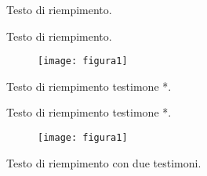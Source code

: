 \documentclass[a4paper]{article}
\begin{document}
\beginnumbering \pstart\Unit Testo di riempimento. \pend
\pausenumbering
\begin{figure}[h]
\centering
{}

\end{figure}
\resumenumbering
 \pstart\Unit Testo di riempimento. \pend
\pausenumbering
\begin{figure}[h]
\centering

\texttt{[image: figura1]}
\end{figure}
\resumenumbering

\pstart\Unit Testo di riempimento testimone *. \pend
\pausenumbering
\begin{figure}[h]
\centering
{}
\par
{}

\end{figure}
\resumenumbering
 \pstart\Unit Testo di riempimento
testimone *. \pend
\pausenumbering
\begin{figure}[h]
\centering

\texttt{[image: figura1]}\par
{}

\end{figure}
\resumenumbering
 \pstart\Unit Testo di riempimento con due testimoni. \pend
\pausenumbering
\begin{figure}[h]
\centering
{}
\par
{}

\end{figure}
\resumenumbering
\end{document}
